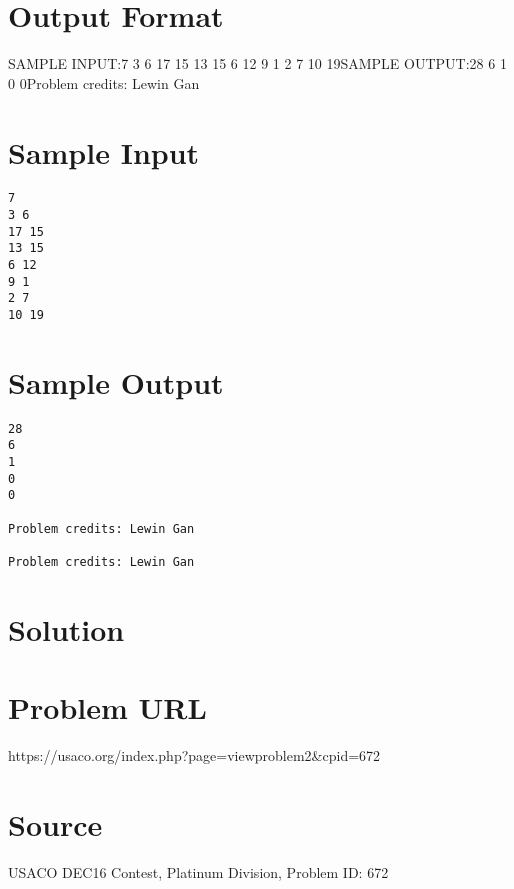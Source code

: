 \documentclass[12pt]{article}
\begin{document}
\section*{Output Format}
SAMPLE INPUT:7
3 6
17 15
13 15
6 12
9 1
2 7
10 19SAMPLE OUTPUT:28
6
1
0
0Problem credits: Lewin Gan

\section*{Sample Input}
\begin{verbatim}
7
3 6
17 15
13 15
6 12
9 1
2 7
10 19
\end{verbatim}

\section*{Sample Output}
\begin{verbatim}
28
6
1
0
0

Problem credits: Lewin Gan

Problem credits: Lewin Gan
\end{verbatim}

\section*{Solution}


\section*{Problem URL}
https://usaco.org/index.php?page=viewproblem2&cpid=672

\section*{Source}
USACO DEC16 Contest, Platinum Division, Problem ID: 672
\end{document}
